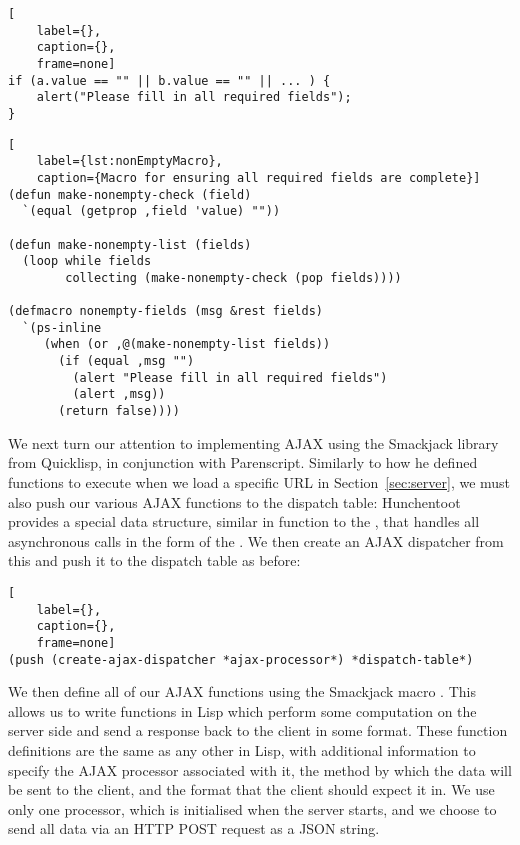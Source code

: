 \begin{lstlisting}[
	label={},
	caption={},
	frame=none]
if (a.value == "" || b.value == "" || ... ) {
    alert("Please fill in all required fields");
}
\end{lstlisting}

\begin{lstlisting}[
	label={lst:nonEmptyMacro},
	caption={Macro for ensuring all required fields are complete}]
(defun make-nonempty-check (field)
  `(equal (getprop ,field 'value) ""))

(defun make-nonempty-list (fields)
  (loop while fields
        collecting (make-nonempty-check (pop fields))))

(defmacro nonempty-fields (msg &rest fields)
  `(ps-inline
     (when (or ,@(make-nonempty-list fields))
       (if (equal ,msg "")
         (alert "Please fill in all required fields")
         (alert ,msg))
       (return false))))
\end{lstlisting}

We next turn our attention to implementing AJAX using the Smackjack library
from Quicklisp, in conjunction with Parenscript. Similarly to how he defined
functions to execute when we load a specific URL in Section~\ref{sec:server},
we must also push our various AJAX functions to the dispatch table: Hunchentoot
provides a special data structure, similar in function to the
, that handles all asynchronous calls in the form of the
. We then create an AJAX dispatcher from this and push it
to the dispatch table as before: 

\begin{lstlisting}[
	label={},
	caption={},
	frame=none]
(push (create-ajax-dispatcher *ajax-processor*) *dispatch-table*)
\end{lstlisting}

We then define all of our AJAX functions using the Smackjack macro
. This allows us to write functions in Lisp which perform some
computation on the server side and send a response back to the client in some
format. These function definitions are the same as any other in Lisp, with
additional information to specify the AJAX processor associated with it, the
method by which the data will be sent to the client, and the format that the
client should expect it in. We use only one processor, 
which is initialised when the server starts, and we choose to send all data via
an HTTP POST request as a JSON string.


